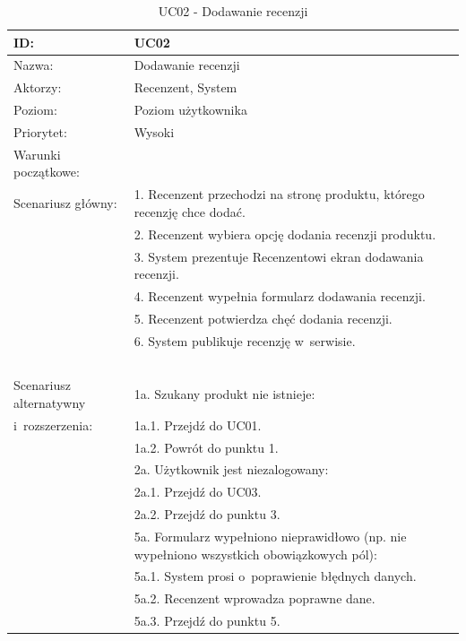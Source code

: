\begin{table}[H]
    \begin{tabular}{|p{5cm}|p{9cm}|}\hline
	ID: & UC02  \\\hline
    Nazwa: & Dodawanie recenzji \\\hline
    Aktorzy: & Recenzent, System \\\hline
    Poziom: & Poziom użytkownika  \\\hline
    Priorytet: & Wysoki \\\hline
    Warunki początkowe: & ~ \\\hline
    Scenariusz główny: & 1. Recenzent przechodzi na stronę produktu, którego recenzję chce dodać. \\
    ~ & 2. Recenzent wybiera opcję dodania recenzji produktu. \\
    ~ & 3. System prezentuje Recenzentowi ekran dodawania recenzji. \\
    ~ & 4. Recenzent wypełnia formularz dodawania recenzji. \\
    ~ & 5. Recenzent potwierdza chęć dodania recenzji. \\
    ~ & 6. System publikuje recenzję w~serwisie. \\
    ~ & ~ \\\hline
    Scenariusz alternatywny & 1a. Szukany produkt nie istnieje: \\
    i~rozszerzenia: & 1a.1. Przejdź do UC01. \\
    ~ & 1a.2. Powrót do punktu 1. \\
    ~ & 2a. Użytkownik jest niezalogowany: \\
    ~ & 2a.1. Przejdź do UC03. \\
    ~ & 2a.2. Przejdź do punktu 3. \\
    ~ & 5a. Formularz wypełniono nieprawidłowo (np. nie wypełniono wszystkich obowiązkowych pól): \\
    ~ & 5a.1. System prosi o~poprawienie błędnych danych. \\
    ~ & 5a.2. Recenzent wprowadza poprawne dane. \\
    ~ & 5a.3. Przejdź do punktu 5. \\
    \hline\end{tabular}
	\caption{UC02 - Dodawanie recenzji}
\end{table}

